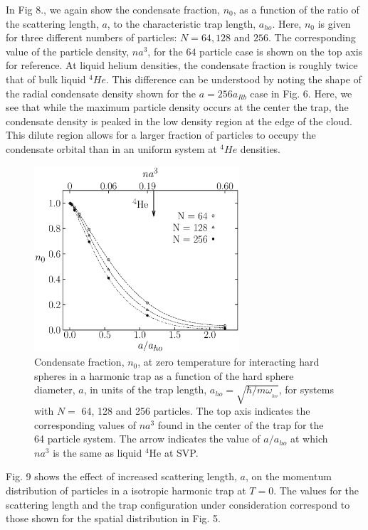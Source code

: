 \documentclass[aps,pra,twocolumn,groupedaddress]{revtex4}
\begin{document}
In Fig 8., we again show the condensate fraction, $n_0$, as a function of the
ratio of the scattering length, $a$, to the characteristic trap length,
$a_{ho}$.  Here, $n_0$ is given for three different numbers of particles:
$N = 64,128$ and $256$.  The corresponding value of the particle density, $na^3$,
for the $64$ particle case is shown on the top axis for reference.  At liquid
helium densities, the condensate fraction is roughly twice that of bulk liquid
$^4He$.  This difference can be understood by noting the shape of the radial
condensate density shown for the $a=256a_{Rb}$ case in Fig. 6.   Here, we
see that while the maximum particle density occurs at the center the trap,
the condensate density is peaked in the low density region at the edge of the
cloud.  This dilute region allows for a larger fraction of particles to
occupy the condensate orbital than in an uniform system at $^4He$ densities.

    \begin{figure}
\begin{center}
\includegraphics[width=3in]{fig8.ps}
 \caption{\footnotesize
Condensate fraction, $n_0$, at zero temperature for interacting
hard spheres in a harmonic trap as a function of the hard sphere
diameter, $a$, in units of the trap length, $a_{ho} =
\sqrt{{\hbar}/{m\omega_{_{ho}}}}$, for systems with $N = $ 64, 128 and
256 particles. The top axis indicates the corresponding values of
$n a^3$ found in the center of the trap for the 64 particle system. The arrow
indicates the value of $a/a_{ho}$ at which $n a^3$ is the
same as liquid $^4$He at SVP.
        }
\end{center}
    \end{figure}

Fig. 9 shows the effect of increased scattering length, $a$, on
the momentum distribution of particles in a isotropic harmonic trap at $T = 0$.
The values for the scattering length and the trap configuration
under consideration correspond to those shown for the spatial
distribution in Fig. 5.
\end{document}
